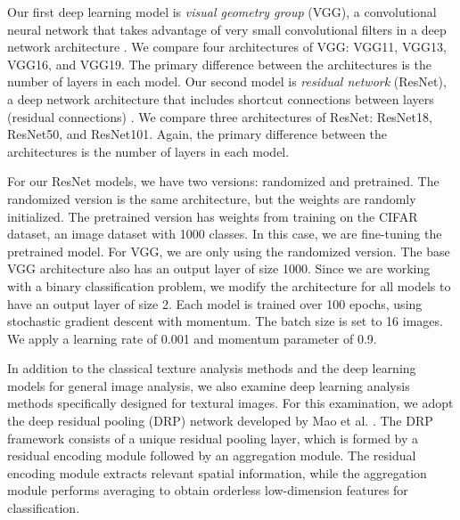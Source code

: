 \documentclass{aci}
\numberwithin{equation}{section}
\begin{document}

Our first deep learning model is \textit{visual geometry group} (VGG), a
convolutional neural network that takes advantage of very small convolutional
filters in a deep network architecture \cite{simonyan_very_2015}. We compare
four architectures of VGG: VGG11, VGG13, VGG16, and VGG19. The primary
difference between the architectures is the number of layers in each model. Our
second model is \textit{residual network} (ResNet), a deep network architecture
that includes shortcut connections between layers (residual connections)
\cite{he_deep_2015}. We compare three architectures of ResNet: ResNet18,
ResNet50, and ResNet101. Again, the primary difference between the architectures
is the number of layers in each model.

For our ResNet models, we have two versions: randomized and pretrained. The
randomized version is the same architecture, but the weights are randomly
initialized. The pretrained version has weights from training on the CIFAR
dataset, an image dataset with 1000 classes. In this case, we are fine-tuning
the pretrained model. For VGG, we are only using the randomized version. The
base VGG architecture also has an output layer of size 1000. Since we are
working with a binary classification problem, we modify the architecture for all
models to have an output layer of size 2. Each model is trained over 100 epochs,
using stochastic gradient descent with momentum. The batch size is set to 16
images. We apply a learning rate of 0.001 and momentum parameter of 0.9.


In addition to the classical texture analysis methods and the deep learning
models for general image analysis, we also examine deep learning analysis
methods specifically designed for textural images. For this examination, we
adopt the deep residual pooling (DRP) network developed by Mao et al.
\cite{mao_deep_2021}. The DRP framework consists of a unique residual pooling
layer, which is formed by a residual encoding module followed by an aggregation
module. The residual encoding module extracts relevant spatial information,
while the aggregation module performs averaging to obtain orderless
low-dimension features for classification.
\end{document}
